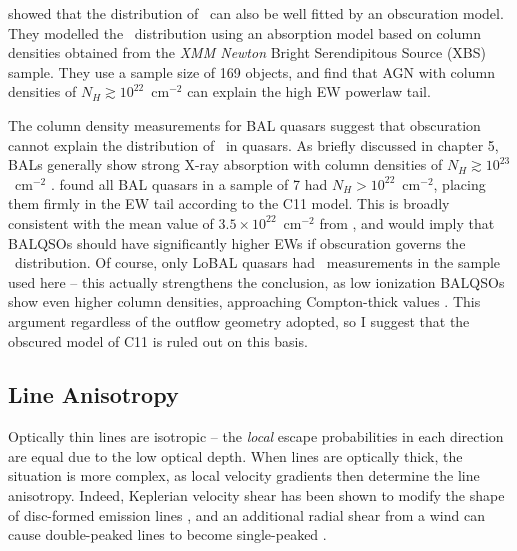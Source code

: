 \citet[][hereafter C11]{caccianiga2011} showed that the distribution of \ewo\
can also be well fitted by an obscuration model. They modelled the 
\ewo\ distribution using an absorption model based on column densities
obtained from the {\sl XMM Newton} Bright Serendipitous Source (XBS)
sample. They use a sample size of 169 objects, and find that AGN with 
column densities of $N_H\gtrsim10^{22}$~cm$^{-2}$ can explain the high
EW powerlaw tail. 

The column density measurements for BAL quasars suggest that obscuration 
cannot explain the distribution of \ewo\ in quasars. 
As briefly discussed in chapter 5, BALs generally show
strong X-ray absorption with column densities of $N_H\gtrsim10^{23}$~cm$^{-2}$
\citep{green1996,mathur2000,green2001,grupemathur2003}. \cite{gallagher1999}
found all BAL quasars in a sample of 7 had $N_H>10^{22}$~cm$^{-2}$, placing
them firmly in the EW tail according to the C11 model. This is broadly
consistent with the mean value of $3.5\times10^{22}$~cm$^{-2}$ from
\cite{morabito2013}, and would imply that BALQSOs should have significantly
higher EWs if obscuration governs the \ewo\ distribution.
Of course, only LoBAL quasars had \ewo\ measurements 
in the sample used here -- this actually strengthens the conclusion, as low ionization 
BALQSOs show even higher column densities, approaching Compton-thick values 
\citep{morabito2011}. This argument regardless of the outflow geometry adopted,
so I suggest that the obscured model of C11 is ruled out on this basis.


\subsection{Line Anisotropy}
\label{sec:line_aniso}

Optically thin lines are isotropic -- the {\em local}
escape probabilities in each direction are equal due to the 
low optical depth. When lines are optically thick, the situation is more
complex, as local velocity gradients then determine the line 
anisotropy. Indeed, Keplerian velocity shear has been shown to modify the
shape of disc-formed emission lines \citep{hornemarsh1986}, and an additional
radial shear from a wind can cause double-peaked lines
to become single-peaked \citep{MC96,MC97,flohic2012}.

